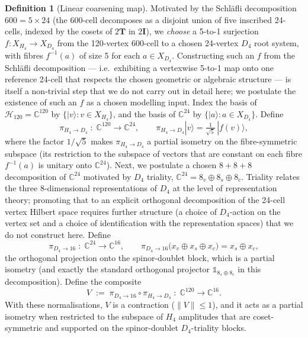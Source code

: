 \documentclass[12pt]{article}
\theoremstyle{definition}
\newtheorem{definition}[theorem]{Definition}
\theoremstyle{remark}
\newcommand{\Hcal}{\mathcal{H}}
\newcommand{\twoI}{2\mathbf{I}}
\newcommand{\twoT}{2\mathbf{T}}
\begin{document}
\begin{definition}[Linear coarsening map]\label{def:V}
Motivated by the Schl\"afli decomposition $600 = 5 \times 24$ (the 600-cell decomposes as a disjoint union of five inscribed 24-cells, indexed by the cosets of $\twoT$ in $\twoI$), we \emph{choose} a 5-to-1 surjection $f: X_{H_4} \to X_{D_4}$ from the 120-vertex 600-cell to a chosen 24-vertex $D_4$ root system, with fibres $f^{-1}(a)$ of size 5 for each $a \in X_{D_4}$. Constructing such an $f$ from the Schl\"afli decomposition --- i.e.\ exhibiting a vertexwise 5-to-1 map onto one reference 24-cell that respects the chosen geometric or algebraic structure --- is itself a non-trivial step that we do not carry out in detail here; we postulate the existence of such an $f$ as a chosen modelling input. Index the basis of $\Hcal_{120} = \mathbb{C}^{120}$ by $\{|v\rangle : v \in X_{H_4}\}$, and the basis of $\mathbb{C}^{24}$ by $\{|a\rangle : a \in X_{D_4}\}$. Define
\[
    \pi_{H_4 \to D_4} \;:\; \mathbb{C}^{120} \longrightarrow \mathbb{C}^{24}, \qquad
    \pi_{H_4 \to D_4}|v\rangle = \tfrac{1}{\sqrt{5}}\,|f(v)\rangle,
\]
where the factor $1/\sqrt{5}$ makes $\pi_{H_4 \to D_4}$ a partial isometry on the fibre-symmetric subspace (its restriction to the subspace of vectors that are constant on each fibre $f^{-1}(a)$ is unitary onto $\mathbb{C}^{24}$). Next, we postulate a chosen $8 + 8 + 8$ decomposition of $\mathbb{C}^{24}$ motivated by $D_4$ triality, $\mathbb{C}^{24} = 8_v \oplus 8_s \oplus 8_c$. Triality relates the three 8-dimensional representations of $D_4$ at the level of representation theory; promoting that to an explicit orthogonal decomposition of the 24-cell vertex Hilbert space requires further structure (a choice of $D_4$-action on the vertex set and a choice of identification with the representation spaces) that we do not construct here. Define
\[
    \pi_{D_4 \to 16} \;:\; \mathbb{C}^{24} \longrightarrow \mathbb{C}^{16}, \qquad
    \pi_{D_4 \to 16}\bigl(x_v \oplus x_s \oplus x_c\bigr) = x_s \oplus x_c,
\]
the orthogonal projection onto the spinor-doublet block, which is a partial isometry (and exactly the standard orthogonal projector $\mathbb{1}_{8_s \oplus 8_c}$ in this decomposition). Define the composite
\begin{equation}
V \;:=\; \pi_{D_4 \to 16} \circ \pi_{H_4 \to D_4} \;:\; \mathbb{C}^{120} \longrightarrow \mathbb{C}^{16}.
\end{equation}
With these normalisations, $V$ is a contraction ($\|V\| \le 1$), and it acts as a partial isometry when restricted to the subspace of $H_4$ amplitudes that are coset-symmetric and supported on the spinor-doublet $D_4$-triality blocks.
\end{definition}
\end{document}

